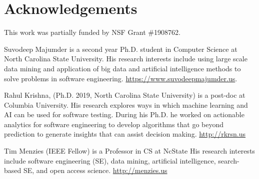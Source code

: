\documentclass[10pt,journal,compsoc]{IEEEtran}
\begin{document}
\section{Acknowledgements}
\label{sec:ack}

This work was partially funded by NSF Grant \#1908762.
\balance

 

\begin{IEEEbiography}{Suvodeep Majumder}
 is a second year Ph.D. student in Computer Science at North Carolina State University.  
  His research interests include using large scale data mining and application of big data and artificial intelligence methods to solve problems in software engineering.
  \url{https://www.suvodeepmajumder.us}.
\end{IEEEbiography}
\begin{IEEEbiography}{Rahul Krishna}, (Ph.D. 2019, North
Carolina State University) is a post-doc at Columbia University.
His research explores ways in which machine learning and AI can be used for software testing.
During his Ph.D. he worked on actionable analytics for software engineering to  develop algorithms that go beyond prediction to generate insights that can assist decision making.   \url{http://rkrsn.us}
\end{IEEEbiography}
\begin{IEEEbiography}{Tim Menzies} (IEEE Fellow)
is a Professor in CS at NcState  His research interests include software engineering (SE), data mining, artificial intelligence, search-based SE, and open access science. \url{http://menzies.us}
\end{IEEEbiography}




\end{document}
